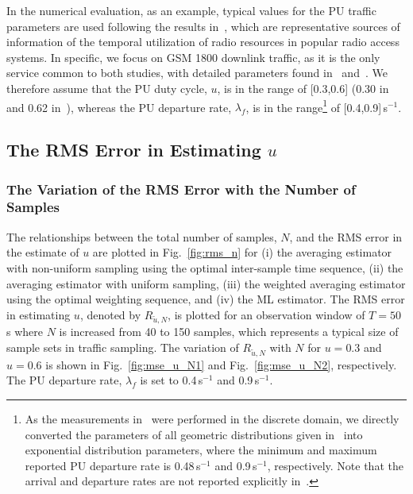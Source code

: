 \documentclass[11pt,draftclsnofoot,journal,onecolumn]{IEEEtran}
\begin{document}
In the numerical evaluation, as an example, typical values for the PU traffic parameters are used following the results in~\cite{liang_tmc_2011,wellens_phycom_2009}, which are representative sources of information of the temporal utilization of radio resources in popular radio access systems. In specific, we focus on GSM 1800 downlink traffic, as it is the only service common to both studies, with detailed parameters found in~\cite[Tab. VIII]{liang_tmc_2011} and~\cite[Tab. 3]{wellens_phycom_2009}. We therefore assume that the PU duty cycle, $u$, is in the range of [0.3,0.6] (0.30 in~\cite{liang_tmc_2011} and 0.62 in~\cite{wellens_phycom_2009}), whereas the PU departure rate, $\lambda_f$, is in the range\footnote{As the measurements in~\cite{wellens_phycom_2009} were performed in the discrete domain, we directly converted the parameters of all geometric distributions given in~\cite[Tab. 3]{wellens_phycom_2009} into exponential distribution parameters, where the minimum and maximum reported PU departure rate is 0.48\,s$^{-1}$ and 0.9\,s$^{-1}$, respectively. Note that the arrival and departure rates are not reported explicitly in~\cite{liang_tmc_2011}.} of [0.4,0.9]\,s$^{-1}$.

\subsection{The RMS Error in Estimating $u$}
\label{sec:num_MSE_u}

\subsubsection{The Variation of the RMS Error with the Number of Samples}

The relationships between the total number of samples, $N$, and the RMS error in the estimate of $u$ are plotted in Fig.~\ref{fig:rms_n} for (i) the averaging estimator with non-uniform sampling using the optimal inter-sample time sequence, (ii) the averaging estimator with uniform sampling, (iii) the weighted averaging estimator using the optimal weighting sequence, and (iv) the ML estimator. The RMS error in estimating $u$, denoted by $R_{\tilde{u},N}$, is plotted for an observation window of $T=50$\,s where $N$ is increased from 40 to 150 samples, which represents a typical size of sample sets in traffic sampling. The variation of $R_{\tilde{u},N}$ with $N$ for $u=0.3$ and $u = 0.6$ is shown in Fig.~\ref{fig:mse_u_N1} and Fig.~\ref{fig:mse_u_N2}, respectively. The PU departure rate, $\lambda_f$ is set to 0.4\,s$^{-1}$ and 0.9\,s$^{-1}$.
\end{document}
